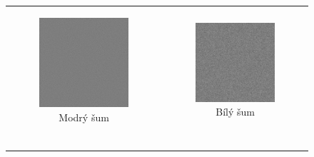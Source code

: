 \begin{figure}[h!]
\begin{tabular}{cc}
\begin{subfigure}{0.45\textwidth}
  \centering
  \includegraphics[width=.8\linewidth]{img/blue_noise}
  \caption{Modrý šum} 
\end{subfigure}&
\begin{subfigure}{0.45\textwidth}
  \centering
  \includegraphics[width=.8\linewidth]{img/white_noise}
  \caption{Bílý šum} 
\end{subfigure}\\
\begin{subfigure}{0.45\textwidth}

\end{subfigure}
\end{tabular}
\end{figure}
